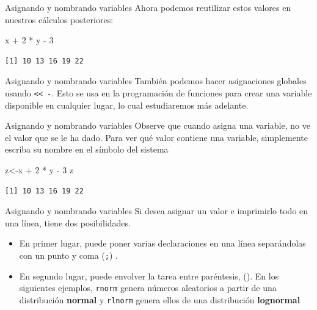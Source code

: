 \documentclass[
  ignorenonframetext,
  aspectratio=169,
  spanish,
]{beamer}
\newenvironment{Shaded}{\begin{snugshade}}{\end{snugshade}}
\newcommand{\DecValTok}[1]{\textcolor[rgb]{0.68,0.00,0.00}{#1}}
\newcommand{\NormalTok}[1]{\textcolor[rgb]{0.00,0.23,0.31}{#1}}
\newcommand{\OtherTok}[1]{\textcolor[rgb]{0.00,0.23,0.31}{#1}}
\newcommand{\SpecialCharTok}[1]{\textcolor[rgb]{0.37,0.37,0.37}{#1}}
\begin{document}
\begin{frame}[fragile]{Asignando y nombrando variables}
\label{asignando-y-nombrando-variables-2}
Ahora podemos reutilizar estos valores en nuestros cálculos posteriores:

\begin{Shaded}
\begin{Highlighting}[]
\NormalTok{x }\SpecialCharTok{+} \DecValTok{2} \SpecialCharTok{*}\NormalTok{ y }\SpecialCharTok{{-}} \DecValTok{3}
\end{Highlighting}
\end{Shaded}

\begin{verbatim}
[1] 10 13 16 19 22
\end{verbatim}
\end{frame}

\begin{frame}[fragile]{Asignando y nombrando variables}
\label{asignando-y-nombrando-variables-3}
También podemos hacer asignaciones globales usando
\texttt{\textless{}\textless{}\ -}. Esto se usa en la programación de
funciones para crear una variable disponible en cualquier lugar, lo cual
estudiaremos más adelante.
\end{frame}

\begin{frame}[fragile]{Asignando y nombrando variables}
\label{asignando-y-nombrando-variables-4}
Observe que cuando asigna una variable, no ve el valor que se le ha
dado. Para ver qué valor contiene una variable, simplemente escriba su
nombre en el símbolo del sistema

\begin{Shaded}
\begin{Highlighting}[]
\NormalTok{z}\OtherTok{\textless{}{-}}\NormalTok{x }\SpecialCharTok{+} \DecValTok{2} \SpecialCharTok{*}\NormalTok{ y }\SpecialCharTok{{-}} \DecValTok{3}
\NormalTok{z}
\end{Highlighting}
\end{Shaded}

\begin{verbatim}
[1] 10 13 16 19 22
\end{verbatim}
\end{frame}

\begin{frame}[fragile]{Asignando y nombrando variables}
\label{asignando-y-nombrando-variables-5}
Si desea asignar un valor e imprimirlo todo en una línea, tiene dos
posibilidades.

\begin{itemize}
\item
  En primer lugar, puede poner varias declaraciones en una línea
  separándolas con un punto y coma (\texttt{;}) .
\item
  En segundo lugar, puede envolver la tarea entre paréntesis, (). En los
  siguientes ejemplos, \texttt{rnorm} genera números aleatorios a partir
  de una distribución \textbf{normal} y \texttt{rlnorm} genera ellos de
  una distribución \textbf{lognormal}
\end{itemize}
\end{frame}
\end{document}
